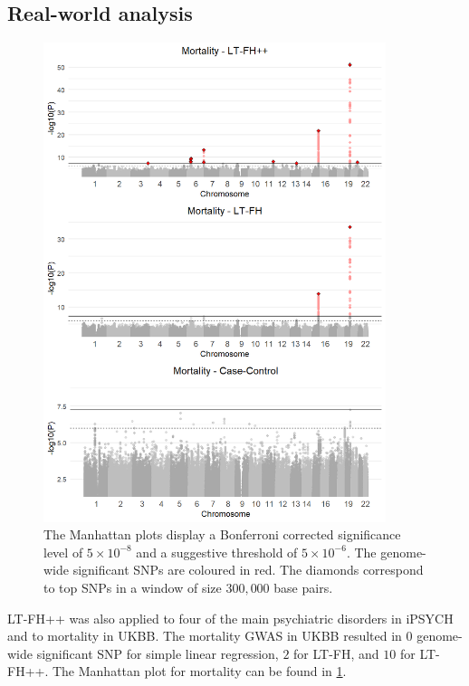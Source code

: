 \subsection{Real-world analysis}
\begin{figure}
	\includegraphics[width=10cm]{results/manhattanPlot_mortality.png}
	\caption[Manhattan plots for LT-FH++, LT-FH, and case-control GWAS of mortality	in the UK Biobank]{The Manhattan plots display a Bonferroni corrected significance level of $ 5\times 10^{-8} $ and a suggestive threshold of $ 5\times 10^{-6} $. The genome-wide significant SNPs are coloured in red. The diamonds correspond to top	SNPs in a window of size $ 300,000 $ base pairs.}
	\label{fig:LTFH++_manhattanMortality}
\end{figure}

LT-FH++ was also applied to four of the main psychiatric disorders in iPSYCH and to mortality in UKBB. The mortality GWAS in UKBB resulted in $ 0 $ genome-wide significant SNP for simple linear regression, $ 2 $ for LT-FH, and $ 10 $ for LT-FH++. The Manhattan plot for mortality can be found in \cref{fig:LTFH++_manhattanMortality}.

